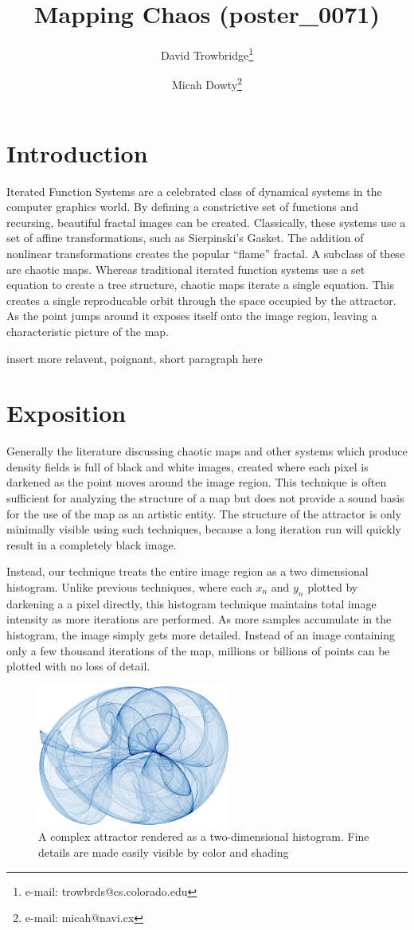 \documentclass{acmsiggraph}
\title{Mapping Chaos (poster\_0071)}
\author{
  David Trowbridge\thanks{e-mail: trowbrds@cs.colorado.edu}
\and
  Micah Dowty\thanks{e-mail: micah@navi.cx}
}
\begin{document}
\maketitle

\section{Introduction}
\copyrightspace
Iterated Function Systems are a celebrated class of dynamical systems in the
computer graphics world. By defining a constrictive set of functions and
recursing, beautiful fractal images can be created. Classically, these
systems use a set of affine transformations, such as Sierpinski's Gasket.
The addition of nonlinear transformations creates the popular ``flame''
fractal. A subclass of these are chaotic maps. Whereas traditional iterated
function systems use a set equation to create a tree structure, chaotic maps
iterate a single equation. This creates a single reproducable orbit through
the space occupied by the attractor. As the point jumps around it exposes
itself onto the image region, leaving a characteristic picture of the map.

insert more relavent, poignant, short paragraph here

\section{Exposition}
Generally the literature discussing chaotic maps and other systems which
produce density fields is full of black and white images, created where
each pixel is darkened as the point moves around the image region. This
technique is often sufficient for analyzing the structure of a map but
does not provide a sound basis for the use of the map as an artistic
entity. The structure of the attractor is only minimally visible using
such techniques, because a long iteration run will quickly result in a
completely black image.

Instead, our technique treats the entire image region as a two dimensional histogram.
Unlike previous techniques, where each $x_n$ and $y_n$ plotted by darkening a
a pixel directly, this histogram technique maintains total image intensity as
more iterations are performed. As more samples accumulate in the histogram,
the image simply gets more detailed. Instead of an image containing only a
few thousand iterations of the map, millions or billions of points can be
plotted with no loss of detail.

\begin{figure}[ht]
\centering
\includegraphics[width=2.5in]{1.png}
\caption{A complex attractor rendered as a two-dimensional histogram.
Fine details are made easily visible by color and shading}
\end{figure}
\end{document}
